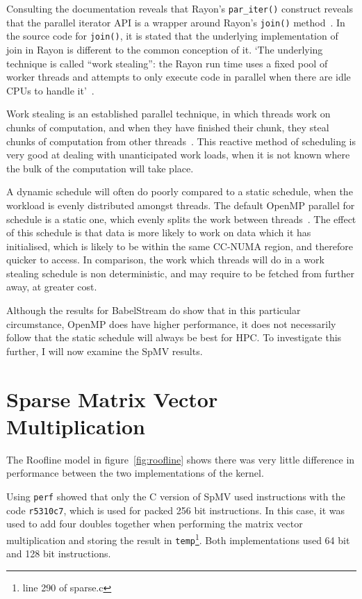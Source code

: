 Consulting the documentation reveals that Rayon's \texttt{par\_iter()} construct reveals that the parallel iterator API is a wrapper around Rayon's \texttt{join()} method~\cite{smallCult}. In the source code for \texttt{join()}, it is stated that the underlying implementation of join in Rayon is different to the common conception of it. 
`The underlying technique is called ``work stealing'': the
Rayon run time uses a fixed pool of worker threads and attempts to only execute code in parallel when there are idle CPUs to handle it'~\cite{joinSrc}.

Work stealing is an established parallel technique, in which threads work on chunks of computation, and when they have finished their chunk, they steal chunks of computation from other threads~\cite{blumofe1999}. This reactive method of scheduling is very good at dealing with unanticipated work loads, when it is not known where the bulk of the computation will take place.

A dynamic schedule will often do poorly compared to a static schedule, when the workload is evenly distributed amongst threads. The default OpenMP parallel for schedule is a static one, which evenly splits the work between threads~\cite{OpenMPSpec5}. The effect of this schedule is that data is more likely to work on data which it has initialised, which is likely to be within the same CC-NUMA region, and therefore quicker to access. In comparison, the work which threads will do in a work stealing schedule is non deterministic, and may require to be fetched from further away, at greater cost.

Although the results for BabelStream do show that in this particular circumstance, OpenMP does have higher performance, it does not necessarily follow that the static schedule will always be best for HPC\@. To investigate this further, I will now examine the SpMV results.

\section{Sparse Matrix Vector Multiplication}\label{sec:res-sparse}

The Roofline model in figure~\ref{fig:roofline} shows there was very little difference in performance between the two implementations of the kernel.

Using \texttt{perf} showed that only the C version of SpMV used instructions with the code \texttt{r5310c7}, which is used for packed 256 bit instructions. In this case, it was used to add four doubles together when performing the matrix vector multiplication and storing the result in \texttt{temp}\footnote{line 290 of sparse.c}. Both implementations used 64 bit and 128 bit instructions. 

